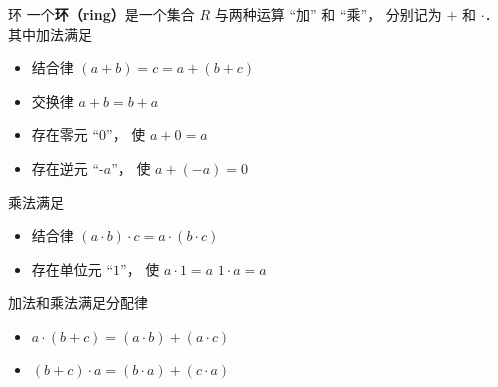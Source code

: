 
\begin{definition}{环}
一个\textbf{环（ring）}是一个集合 $R$ 与两种运算 “加” 和 “乘”， 分别记为 $+$ 和 $\cdot$． 其中加法满足 
\begin{itemize}
\item 结合律 $(a + b) = c = a + (b + c)$
\item 交换律 $a + b = b + a$
\item 存在零元 “$0$”， 使 $a + 0 = a$
\item 存在逆元 “-$a$”， 使 $a + (-a) = 0$
\end{itemize}
乘法满足
\begin{itemize}
\item 结合律 $(a\cdot b)\cdot c = a \cdot (b \cdot c)$
\item 存在单位元 “$1$”， 使 $a \cdot 1 = a$ $1 \cdot a = a$
\end{itemize}
加法和乘法满足分配律
\begin{itemize}
\item $a \cdot (b + c) = (a \cdot b) + (a \cdot c)$
\item $(b + c) \cdot a = (b \cdot a) + (c \cdot a)$
\end{itemize}
\end{definition}
